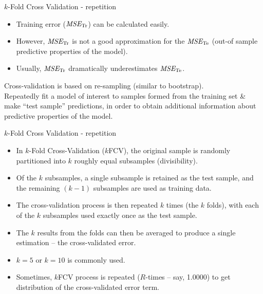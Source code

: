 \documentclass{beamer}
\begin{document}
\begin{frame}{$k$-Fold Cross Validation - repetition}
\begin{itemize}
\item Training error ($\textit{MSE}_{\textnormal{Tr}}$) can be calculated easily. 
\item However, $\textit{MSE}_{\textnormal{Tr}}$ is not a good approximation for the $\textit{MSE}_{\textnormal{Te}}$ (out-of sample predictive properties of the model).
\item Usually, $\textit{MSE}_{\textnormal{Tr}}$ dramatically underestimates $\textit{MSE}_{\textnormal{Te}}$.
\end{itemize}
\bigskip
Cross-validation is based on re-sampling (similar to bootstrap).\\
\medskip
Repeatedly fit a model of interest to samples formed from the training set \& make ``test sample'' predictions, in order to obtain additional information about predictive properties of the model.\\
\end{frame}
\begin{frame}{$k$-Fold Cross Validation - repetition}
\begin{itemize}
  \item In $k$-Fold Cross-Validation ($k$FCV), the original sample is randomly partitioned into $k$ roughly equal subsamples (divisibility). 
  \item Of the $k$ subsamples, a single subsample is retained as the test sample, and the remaining $(k-1)$ subsamples are used as training data. 
  \item The cross-validation process is then repeated $k$ times (the $k$ folds), with each of the $k$ subsamples used exactly once as the test sample. 
  \item The $k$ results from the folds can then be averaged to produce a single estimation -- the cross-validated error. 
  \item $k = 5$ or $k=10$ is commonly used.
  \item Sometimes, $k$FCV process is repeated ($R$-times -- say, 1.0000) to get distribution of the cross-validated error term.
\end{itemize}  
\end{frame}
\end{document}
